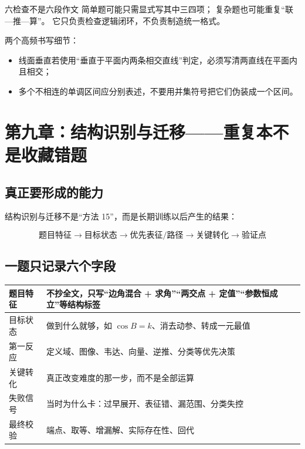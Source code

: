 \documentclass[11pt,a4paper]{ctexart}
\begin{document}
\begin{warningbox}{六检查不是六段作文}
简单题可能只需显式写其中三四项；
复杂题也可能重复“联—推—算”。
它只负责检查逻辑闭环，不负责制造统一格式。
\end{warningbox}

两个高频书写细节：
\begin{itemize}
  \item 线面垂直若使用“垂直于平面内两条相交直线”判定，必须写清两直线在平面内且相交；
  \item 多个不相连的单调区间应分别表述，不要用并集符号把它们伪装成一个区间。
\end{itemize}

\section{第九章：结构识别与迁移——重复本不是收藏错题}

\subsection{真正要形成的能力}

结构识别与迁移不是“方法 15”，而是长期训练以后产生的结果：

\[
\boxed{
\text{题目特征}
\rightarrow
\text{目标状态}
\rightarrow
\text{优先表征/路径}
\rightarrow
\text{关键转化}
\rightarrow
\text{验证点}}
\]

\subsection{一题只记录六个字段}

\begin{longtable}{p{2.6cm}p{11.8cm}}
\toprule
题目特征 & 不抄全文，只写“边角混合 + 求角”“两交点 + 定值”“参数恒成立”等结构标签\\ \hline
目标状态 & 做到什么就够，如 $\cos B=k$、消去动参、转成一元最值\\ \hline
第一反应 & 定义域、图像、韦达、向量、逆推、分类等优先决策\\ \hline
关键转化 & 真正改变难度的那一步，而不是全部运算\\ \hline
失败信号 & 当时为什么卡：过早展开、表征错、漏范围、分类失控\\ \hline
最终校验 & 端点、取等、增漏解、实际存在性、回代\\
\bottomrule
\end{longtable}
\end{document}
